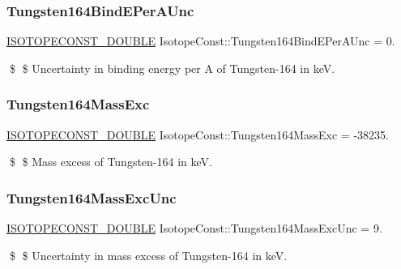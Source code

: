 \subsubsection{\texorpdfstring{Tungsten164\+Bind\+E\+Per\+A\+Unc}{Tungsten164BindEPerAUnc}}
{\footnotesize\ttfamily \mbox{\hyperlink{group___isotope_const-_macros_ga8f45a7272ce02c0b4c65c44636ed719a}{I\+S\+O\+T\+O\+P\+E\+C\+O\+N\+S\+T\+\_\+\+D\+O\+U\+B\+LE}} Isotope\+Const\+::\+Tungsten164\+Bind\+E\+Per\+A\+Unc = 0.}

\$ \$ Uncertainty in binding energy per A of Tungsten-\/164 in keV. \mbox{\label{group___isotope_const-_tungsten-_w164_gab5c4eca2c302cbe18e5236b76057d2c5}} 
\subsubsection{\texorpdfstring{Tungsten164\+Mass\+Exc}{Tungsten164MassExc}}
{\footnotesize\ttfamily \mbox{\hyperlink{group___isotope_const-_macros_ga8f45a7272ce02c0b4c65c44636ed719a}{I\+S\+O\+T\+O\+P\+E\+C\+O\+N\+S\+T\+\_\+\+D\+O\+U\+B\+LE}} Isotope\+Const\+::\+Tungsten164\+Mass\+Exc = -\/38235.}

\$ \$ Mass excess of Tungsten-\/164 in keV. \mbox{\label{group___isotope_const-_tungsten-_w164_ga4691b64c5c957647ebfe34031fe8e542}} 
\subsubsection{\texorpdfstring{Tungsten164\+Mass\+Exc\+Unc}{Tungsten164MassExcUnc}}
{\footnotesize\ttfamily \mbox{\hyperlink{group___isotope_const-_macros_ga8f45a7272ce02c0b4c65c44636ed719a}{I\+S\+O\+T\+O\+P\+E\+C\+O\+N\+S\+T\+\_\+\+D\+O\+U\+B\+LE}} Isotope\+Const\+::\+Tungsten164\+Mass\+Exc\+Unc = 9.}

\$ \$ Uncertainty in mass excess of Tungsten-\/164 in keV. \mbox{\label{group___isotope_const-_tungsten-_w164_ga728a34d24f301d753ff631a53c39ee1b}} 
